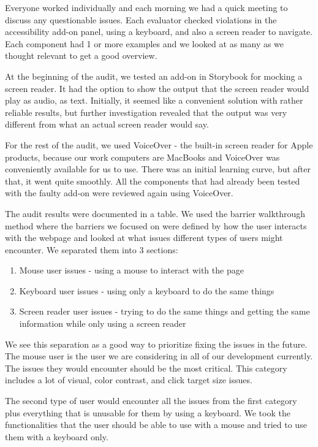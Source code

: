 \documentclass{master_thesis}
\begin{document}
Everyone worked individually and each morning we had a quick meeting to discuss any questionable issues. Each evaluator checked violations in the accessibility add-on panel, using a keyboard, and also a screen reader to navigate. Each component had 1 or more examples and we looked at as many as we thought relevant to get a good overview.

At the beginning of the audit, we tested an add-on in Storybook for mocking a screen reader\citep{Lara}. It had the option to show the output that the screen reader would play as audio, as text. Initially, it seemed like a convenient solution with rather reliable results, but further investigation revealed that the output was very different from what an actual screen reader would say.

For the rest of the audit, we used VoiceOver - the built-in screen reader for Apple products, because our work computers are MacBooks and VoiceOver was conveniently available for us to use. There was an initial learning curve, but after that, it went quite smoothly. All the components that had already been tested with the faulty add-on were reviewed again using VoiceOver.

The audit results were documented in a table. We used the barrier walkthrough method where the barriers we focused on were defined by how the user interacts with the webpage and looked at what issues different types of users might encounter. We separated them into 3 sections:
\begin{enumerate}
	\item Mouse user issues - using a mouse to interact with the page
	\item Keyboard user issues - using only a keyboard to do the same things

	\item Screen reader user issues - trying to do the same things and getting the same information while only using a screen reader
\end{enumerate}

We see this separation as a good way to prioritize fixing the issues in the future. The mouse user is the user we are considering in all of our development currently. The issues they would encounter should be the most critical. This category includes a lot of visual, color contrast, and click target size issues.

The second type of user would encounter all the issues from the first category plus everything that is unusable for them by using a keyboard. We took the functionalities that the user should be able to use with a mouse and tried to use them with a keyboard only.
\end{document}
